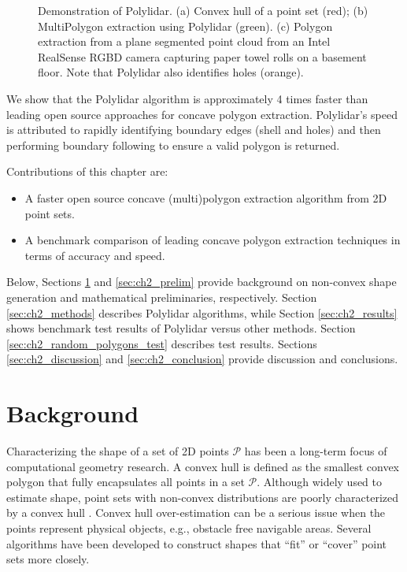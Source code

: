 \begin{figure}[t]
\begin{subfigure}{.25\linewidth}
    \caption{}
    \label{fig:ch2_realsense}
  \end{subfigure}
  \caption[Demonstration of Polylidar]{Demonstration of Polylidar. (a) Convex hull of a point set (red); (b) MultiPolygon extraction using Polylidar (green).
  (c) Polygon extraction from a plane segmented point cloud from an Intel RealSense RGBD camera capturing paper towel rolls on a basement floor. 
  Note that Polylidar also identifies holes (orange).}
  \label{fig:ch2_convex_concave} 
\end{figure}



We show that the Polylidar algorithm is approximately 4 times faster than leading open source approaches for concave polygon extraction. Polylidar's speed is attributed to rapidly identifying boundary edges (shell and holes) and then performing  boundary following to ensure a valid polygon is returned. 


Contributions of this chapter are:
\begin{itemize}
  \item A faster open source \cite{Castagno_Github_Polylidar} concave (multi)polygon extraction algorithm from 2D point sets.
  \item A benchmark comparison of leading concave polygon extraction techniques in terms of accuracy and speed.
\end{itemize}

Below, Sections \ref{sec:ch2_background} and \ref{sec:ch2_prelim} provide background on non-convex shape generation and mathematical preliminaries, respectively. Section \ref{sec:ch2_methods} describes Polylidar algorithms, while Section \ref{sec:ch2_results} shows benchmark test results of Polylidar versus other methods.  Section \ref{sec:ch2_random_polygons_test} describes test results. Sections  \ref{sec:ch2_discussion} and \ref{sec:ch2_conclusion} provide discussion and conclusions.



\section{Background}\label{sec:ch2_background}

Characterizing the shape of a set of 2D points $\mathcal{P}$ has been a long-term focus of computational geometry research. A convex hull is defined as the smallest convex polygon that fully encapsulates all points in a set $\mathcal{P}$.  Although widely used to estimate shape, point sets with non-convex distributions are poorly characterized by a convex hull \cite{duckham_efficient_2008}.  Convex hull over-estimation can be a serious issue when the points represent physical objects, e.g., obstacle free navigable areas. Several algorithms have been developed to construct shapes that ``fit'' or ``cover'' point sets more closely. 

